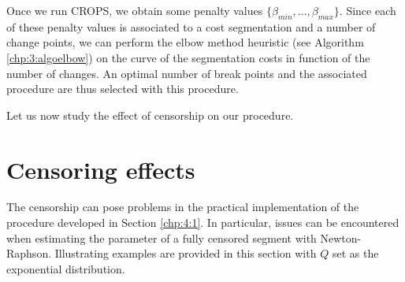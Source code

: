 Once we run CROPS, we obtain some penalty values $\{\beta_{min},\dots,\beta_{max}\}$. Since each of these penalty values is associated to a cost segmentation and a number of change points, we can perform the elbow method heuristic (see Algorithm \ref{chp:3:algoelbow}) on the curve of the segmentation costs in function of the number of changes. An optimal number of break points and the associated procedure are thus selected with this procedure.

Let us now study the effect of censorship on our procedure.

\section{Censoring effects}\label{chp:4:2}

%

The censorship can pose problems in the practical implementation of the procedure developed in Section \ref{chp:4:1}. In particular, issues can be encountered when estimating the parameter of a fully censored segment with Newton-Raphson. Illustrating examples are provided in this section with $Q$ set as the exponential distribution.

